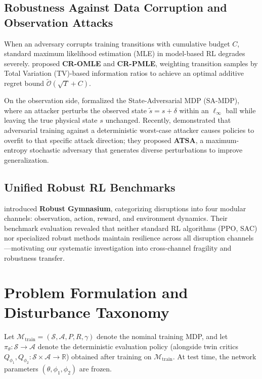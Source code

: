 \documentclass{article}
\begin{document}
\subsection{Robustness Against Data Corruption and Observation Attacks}
When an adversary corrupts training transitions with cumulative budget $C$, standard maximum likelihood estimation (MLE) in model-based RL degrades severely. \citet{ye2024towards} proposed \textbf{CR-OMLE} and \textbf{CR-PMLE}, weighting transition samples by Total Variation (TV)-based information ratios to achieve an optimal additive regret bound $\tilde{\mathcal{O}}(\sqrt{T} + C)$.

On the observation side, \citet{zhang2020robust} formalized the State-Adversarial MDP (SA-MDP), where an attacker perturbs the observed state $\tilde{s} = s + \delta$ within an $\ell_\infty$ ball while leaving the true physical state $s$ unchanged. Recently, \citet{zhou2025robust} demonstrated that adversarial training against a deterministic worst-case attacker causes policies to overfit to that specific attack direction; they proposed \textbf{ATSA}, a maximum-entropy stochastic adversary that generates diverse perturbations to improve generalization.

\subsection{Unified Robust RL Benchmarks}
\citet{gu2025robust} introduced \textbf{Robust Gymnasium}, categorizing disruptions into four modular channels: observation, action, reward, and environment dynamics. Their benchmark evaluation revealed that neither standard RL algorithms (PPO, SAC) nor specialized robust methods maintain resilience across all disruption channels---motivating our systematic investigation into cross-channel fragility and robustness transfer.


\section{Problem Formulation and Disturbance Taxonomy}

Let $\mathcal{M}_{\text{train}} = (\mathcal{S}, \mathcal{A}, P, R, \gamma)$ denote the nominal training MDP, and let $\pi_\theta: \mathcal{S} \to \mathcal{A}$ denote the deterministic evaluation policy (alongside twin critics $Q_{\phi_1}, Q_{\phi_2}: \mathcal{S} \times \mathcal{A} \to \mathbb{R}$) obtained after training on $\mathcal{M}_{\text{train}}$. At test time, the network parameters $(\theta, \phi_1, \phi_2)$ are frozen.
\end{document}
